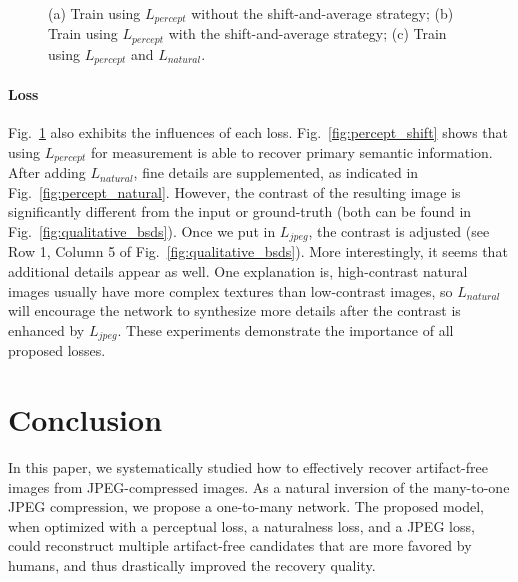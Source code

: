 \documentclass[10pt,twocolumn,letterpaper]{article}
\begin{document}
\begin{figure}[t]
\vspace{-0.5em}
\centering
{}
\hfil
{}
\hfil
{}
\vspace{-1em}
\caption{(a) Train using $L_{percept}$ without the shift-and-average strategy; (b) Train using $L_{percept}$ with the shift-and-average strategy; (c) Train using $L_{percept}$ and $L_{natural}$.}
\label{fig:further_analysis}
\vspace{-1.5em}
\end{figure}

\paragraph{Loss}
Fig.~\ref{fig:further_analysis} also exhibits the influences of each loss. Fig.~\ref{fig:percept_shift} shows that using $L_{percept}$ for measurement is able to recover primary semantic information. After adding $L_{natural}$, fine details are supplemented, as indicated in Fig.~\ref{fig:percept_natural}. However, the contrast of the resulting image is significantly different from the input or ground-truth (both can be found in Fig.~\ref{fig:qualitative_bsds}). Once we put in $L_{jpeg}$, the contrast is adjusted (see Row 1, Column 5 of Fig.~\ref{fig:qualitative_bsds}). More interestingly, it seems that additional details appear as well. One explanation is, high-contrast natural images usually have more complex textures than low-contrast images, so $L_{natural}$ will encourage the network to synthesize more details after the contrast is enhanced by $L_{jpeg}$. These experiments demonstrate the importance of all proposed losses.

\section{Conclusion}
In this paper, we systematically studied how to effectively recover artifact-free images from JPEG-compressed images. As a natural inversion of the many-to-one JPEG compression, we propose a one-to-many network. The proposed model, when optimized with a perceptual loss, a naturalness loss, and a JPEG loss, could reconstruct multiple artifact-free candidates that are more favored by humans, and thus drastically improved the recovery quality.
\end{document}
